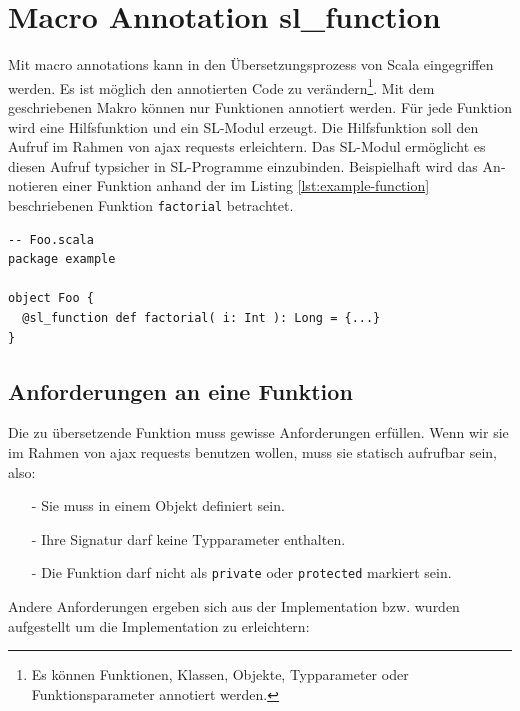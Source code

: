 \documentclass[12pt,bibtotoc]{scrreprt}
\begin{document}

\section{Macro Annotation sl\_function }
\label{sec:annotation-macro}

Mit macro annotations kann in den Übersetzungsprozess von Scala eingegriffen werden\cite{EPFL1}. Es ist möglich den annotierten Code zu verändern\footnote{Es können Funktionen, Klassen, Objekte, Typparameter oder Funktionsparameter annotiert werden.}. Mit dem geschriebenen Makro können nur Funktionen annotiert werden. Für jede Funktion wird eine Hilfsfunktion und ein \ac{SL}-Modul erzeugt. Die Hilfsfunktion soll den Aufruf im Rahmen von ajax requests erleichtern. Das \ac{SL}-Modul ermöglicht es diesen Aufruf typsicher in \ac{SL}-Programme einzubinden. Beispielhaft wird das An­no­tie­ren einer Funktion anhand der im Listing \ref{lst:example-function} beschriebenen Funktion \lstinline!factorial! betrachtet.


\begin{lstlisting}[caption=Scala Beispielfunktion, label=lst:example-function, float=h]
-- Foo.scala
package example

object Foo {
  @sl_function def factorial( i: Int ): Long = {...}
}
\end{lstlisting}

\subsection{Anforderungen an eine Funktion}

Die zu übersetzende Funktion muss gewisse Anforderungen erfüllen. Wenn wir sie im Rahmen von ajax requests benutzen wollen, muss sie statisch aufrufbar sein, also:
\begin{itemize}
  \item[-]{Sie muss in einem Objekt definiert sein.}
  \item[-]{Ihre Signatur darf keine Typparameter enthalten.}
  \item[-]{Die Funktion darf nicht als \lstinline!private! oder \lstinline!protected! markiert sein.}
 \end{itemize}

Andere Anforderungen ergeben sich aus der Implementation bzw. wurden aufgestellt um die Implementation zu erleichtern:
\end{document}
